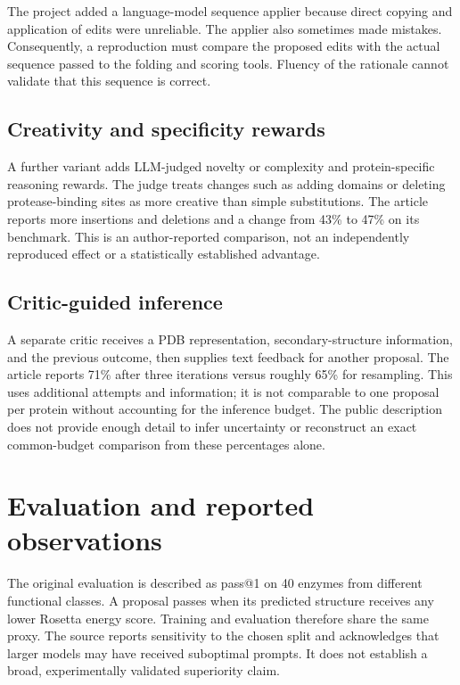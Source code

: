 \documentclass[10pt,a4paper]{article}
\begin{document}
The project added a language-model sequence applier because direct copying and application of edits were unreliable. The applier also sometimes made mistakes. Consequently, a reproduction must compare the proposed edits with the actual sequence passed to the folding and scoring tools. Fluency of the rationale cannot validate that this sequence is correct. \cite{ref1,ref2}

\subsection{Creativity and specificity rewards}
A further variant adds LLM-judged novelty or complexity and protein-specific reasoning rewards. The judge treats changes such as adding domains or deleting protease-binding sites as more creative than simple substitutions. The article reports more insertions and deletions and a change from 43\% to 47\% on its benchmark. This is an author-reported comparison, not an independently reproduced effect or a statistically established advantage. \cite{ref1}

\subsection{Critic-guided inference}
A separate critic receives a PDB representation, secondary-structure information, and the previous outcome, then supplies text feedback for another proposal. The article reports 71\% after three iterations versus roughly 65\% for resampling. This uses additional attempts and information; it is not comparable to one proposal per protein without accounting for the inference budget. The public description does not provide enough detail to infer uncertainty or reconstruct an exact common-budget comparison from these percentages alone. \cite{ref1}

\section{Evaluation and reported observations}
The original evaluation is described as pass@1 on 40 enzymes from different functional classes. A proposal passes when its predicted structure receives any lower Rosetta energy score. Training and evaluation therefore share the same proxy. The source reports sensitivity to the chosen split and acknowledges that larger models may have received suboptimal prompts. It does not establish a broad, experimentally validated superiority claim. \cite{ref1}
\end{document}
